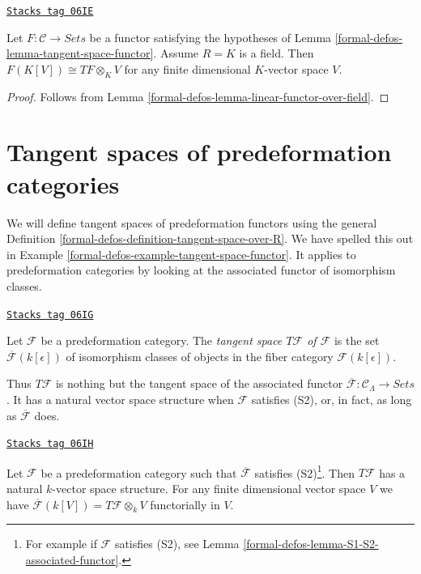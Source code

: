 \begin{lemma}
\label{formal-defos-lemma-tangent-space-tensor}
\href{https://stacks.math.columbia.edu/tag/06IE}{\texttt{Stacks tag 06IE}}

Let $F: \mathcal{C} \to \textit{Sets}$ be a functor satisfying the
hypotheses of
Lemma \ref{formal-defos-lemma-tangent-space-functor}.
Assume $R = K$ is a field. Then $F(K[V]) \cong TF \otimes_K V$
for any finite dimensional $K$-vector space $V$.
\end{lemma}

\begin{proof}
Follows from
Lemma \ref{formal-defos-lemma-linear-functor-over-field}.
\end{proof}

\section{Tangent spaces of predeformation categories}
\label{formal-defos-section-tangent-spaces}
We will define tangent spaces of predeformation functors using the general
Definition \ref{formal-defos-definition-tangent-space-over-R}.
We have spelled this out in
Example \ref{formal-defos-example-tangent-space-functor}.
It applies to predeformation categories by looking at the associated
functor of isomorphism classes.

\begin{definition}
\label{formal-defos-definition-tangent-space}
\href{https://stacks.math.columbia.edu/tag/06IG}{\texttt{Stacks tag 06IG}}

Let $\mathcal{F}$ be a predeformation category.
The {\it tangent space $T \mathcal{F}$ of $\mathcal{F}$}
is the set $\overline{\mathcal{F}}(k[\epsilon])$
of isomorphism classes of objects in the fiber category $\mathcal
F(k[\epsilon])$.
\end{definition}

Thus $T \mathcal{F}$ is nothing but the tangent space of the associated
functor $\overline{\mathcal{F}}: \mathcal{C}_\Lambda \to \textit{Sets}$.
It has a natural vector space structure when $\mathcal{F}$ satisfies (S2),
or, in fact, as long as $\overline{\mathcal{F}}$ does.

\begin{lemma}
\label{formal-defos-lemma-tangent-space-vector-space}
\href{https://stacks.math.columbia.edu/tag/06IH}{\texttt{Stacks tag 06IH}}

Let $\mathcal{F}$ be a predeformation category such that
$\overline{\mathcal{F}}$ satisfies (S2)\footnote{For example
if $\mathcal{F}$ satisfies (S2), see
Lemma \ref{formal-defos-lemma-S1-S2-associated-functor}.}. Then $T \mathcal{F}$ has a
natural $k$-vector space structure. For any finite dimensional
vector space $V$ we have
$\overline{\mathcal{F}}(k[V]) = T\mathcal{F} \otimes_k V$
functorially in $V$.
\end{lemma}


